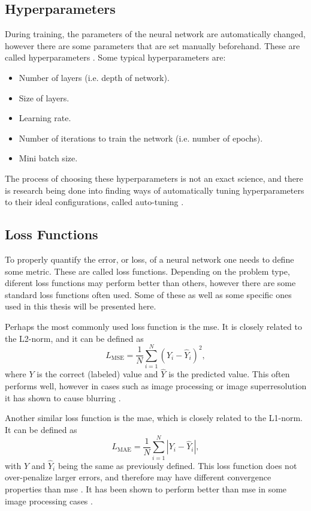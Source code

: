 \subsection{Hyperparameters}
During training, the parameters of the neural network are automatically changed, however there are some parameters that are set manually beforehand. These are called hyperparameters \cite{claesen2015hyperparameter}. Some typical hyperparameters are:
\begin{itemize}
    \item Number of layers (i.e. depth of network).
    \item Size of layers.
    \item Learning rate.
    \item Number of iterations to train the network (i.e. number of epochs).
    \item Mini batch size.
\end{itemize}

The process of choosing these hyperparameters is not an exact science, and there is research being done into finding ways of automatically tuning hyperparameters to their ideal configurations, called auto-tuning \cite{autotuning}.

\subsection{Loss Functions}
To properly quantify the error, or loss, of a neural network one needs to define some metric. These are called loss functions. Depending on the problem type, diferent loss functions may perform better than others, however there are some standard loss functions often used. Some of these as well as some specific ones used in this thesis will be presented here.

Perhaps the most commonly used loss function is the \acrfull{mse}. It is closely related to the L2-norm, and it can be defined as
\begin{equation}
    \label{eq:mse}
    L_{\text{MSE}} = \frac{1}{N} \sum_{i=1}^N(Y_i - \hat{Y}_i)^2,
\end{equation}
where $Y$ is the correct (labeled) value and $\hat{Y}$ is the predicted value. This often performs well, however in cases such as image processing or image superresolution it has shown to cause blurring \cite{7797130}.

Another similar loss function is the \acrfull{mae}, which is closely related to the L1-norm. It can be defined as
\begin{equation}
    \label{eq:mae}
    L_{\text{MAE}} = \frac{1}{N} \sum_{i=1}^N |Y_i - \hat{Y}_i|,
\end{equation}
with $Y$ and $\hat{Y}_i$ being the same as previously defined. This loss function does not over-penalize larger errors, and therefore may have different convergence properties than \acrshort{mse} \cite{7797130}. It has been shown to perform better than \acrshort{mse} in some image processing cases \cite{7797130,10.1002/mp.13713}.

